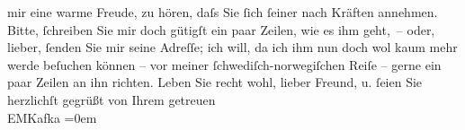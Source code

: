 \begin{ledgroupsized}[t]{13cm}
                    mir eine warme Freude, zu hören, daſs Sie ſich ſeiner nach Kräften annehmen.
                    Bitte, ſchreiben Sie mir doch gütigſt ein paar Zeilen, wie es ihm geht, – oder,
                    lieber, ſenden Sie mir seine Adreſſe; ich will, da ich ihm nun doch wol kaum
                    mehr werde beſuchen können – vor meiner ſchwediſch-norwegiſchen Reiſe –
                    gerne ein paar Zeilen an ihn richten.\pend
           \pstart
           Leben Sie recht wohl, lieber Freund, u. ſeien Sie herzlichſt gegrüßt\pend
           \pstart
           von Ihrem getreuen{\\[\baselineskip]}\spacefill\mbox{EMKafka}\pend
           \leftskip=0em{}
         
         \endnumbering{}\end{ledgroupsized}  \newcommand{\dateiname}{L00187}\newcommand{\titel}{Eduard Michael Kafka an Arthur Schnitzler, 7. 3. 1893}\newcommand{\editorInnen}{Martin Anton Müller und Gerd-Hermann Susen}
      